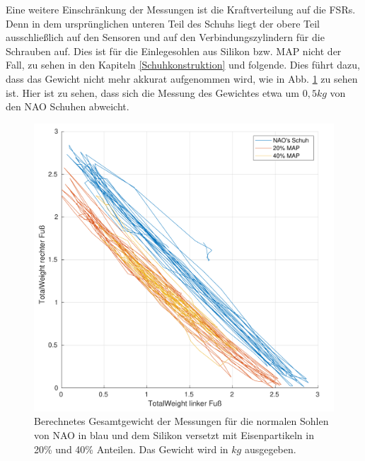 Eine weitere Einschränkung der Messungen ist die Kraftverteilung auf die FSRs. Denn in dem ursprünglichen unteren Teil des Schuhs liegt der obere Teil ausschließlich auf den Sensoren und auf den Verbindungszylindern für die Schrauben auf. Dies ist für die Einlegesohlen aus Silikon bzw. MAP nicht der Fall, zu sehen in den Kapiteln \ref{Schuhkonstruktion} und folgende. Dies führt dazu, dass das Gewicht nicht mehr akkurat aufgenommen wird, wie in Abb. \ref{total_weight} zu sehen ist. Hier ist zu sehen, dass sich die Messung des Gewichtes etwa um $0,5 \unit{kg}$ von den NAO Schuhen abweicht. 
\begin{figure}[tb]
	\centering
	\includegraphics[width=0.9\linewidth]{Bilder/TotalWeight_Grund_20_40_mean.pdf}
	\caption{Berechnetes Gesamtgewicht der Messungen für die normalen Sohlen von NAO in blau und dem Silikon versetzt mit Eisenpartikeln in 20\% und 40\% Anteilen. Das Gewicht wird in $\unit{kg}$ ausgegeben.}
	\label{total_weight}
\end{figure}

